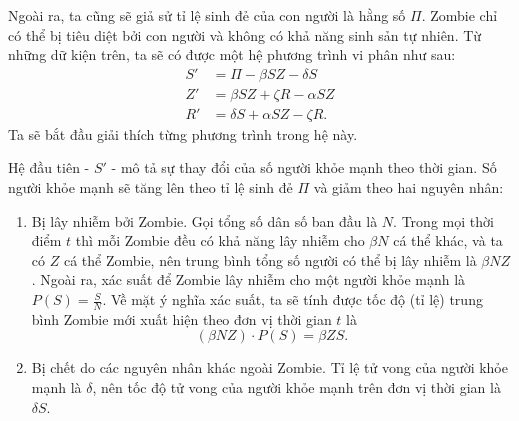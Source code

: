 \documentclass[12pt]{scrartcl}
\begin{document}
Ngoài ra, ta cũng sẽ giả sử tỉ lệ sinh đẻ của con người là hằng số $\Pi$. Zombie chỉ có thể bị tiêu diệt bởi con người và không có khả năng sinh sản tự nhiên. Từ những dữ kiện trên, ta sẽ có được một hệ phương trình vi phân như sau:
\[
    \begin{aligned}
    S' &= \Pi - \beta S Z - \delta S \\
    Z' &= \beta S Z + \zeta R - \alpha SZ\\
    R' &= \delta S + \alpha SZ - \zeta R.
    \end{aligned}
\]
Ta sẽ bắt đầu giải thích từng phương trình trong hệ này. 

Hệ đầu tiên - $S'$ - mô tả sự thay đổi của số người khỏe mạnh theo thời gian. Số người khỏe mạnh sẽ tăng lên theo tỉ lệ sinh đẻ $\Pi$ và giảm theo hai nguyên nhân: 
\begin{enumerate}
    \item Bị lây nhiễm bởi Zombie. Gọi tổng số dân số ban đầu là $N$. Trong mọi thời điểm $t$ thì mỗi Zombie đều có khả năng lây nhiễm cho $\beta N$ cá thể khác, và ta có $Z$ cá thể Zombie, nên trung bình tổng số người có thể bị lây nhiễm là $\beta N Z$. Ngoài ra, xác suất để Zombie lây nhiễm cho một người khỏe mạnh là $P(S) = \frac{S}{N}$. Về mặt ý nghĩa xác suất, ta sẽ tính được tốc độ (tỉ lệ) trung bình Zombie mới xuất hiện theo đơn vị thời gian $t$ là 
    \[
        (\beta NZ) \cdot P(S) = \beta Z S.
    \]
    \item Bị chết do các nguyên nhân khác ngoài Zombie. Tỉ lệ tử vong của người khỏe mạnh là $\delta$, nên tốc độ tử vong của người khỏe mạnh trên đơn vị thời gian là $\delta S$.
\end{enumerate}
\end{document}
